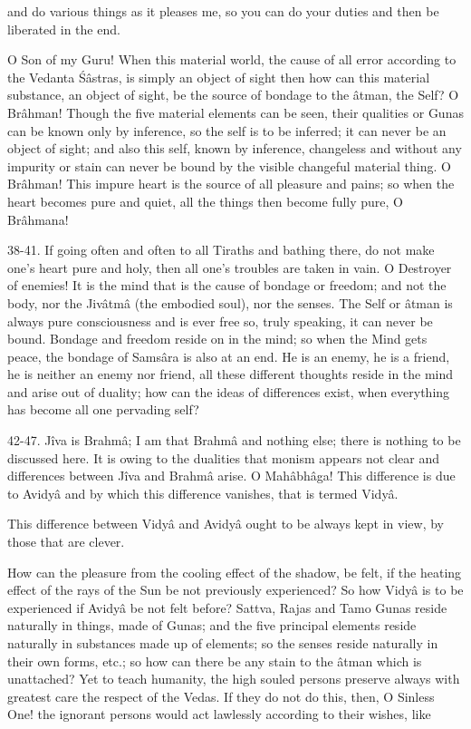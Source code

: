 and do various things as it pleases me, so you can do your duties and then be liberated in the end.

O Son of my Guru! When this material world, the cause of all error according to the Vedanta \'S\^astras, is simply an object of sight then how can this material substance, an object of sight, be the source of bondage to the \^atman, the Self? O Br\^ahman! Though the five material elements can be seen, their qualities or Gunas can be known only by inference, so the self is to be inferred; it can never be an object of sight; and also this self, known by inference, changeless and without any impurity or stain can never be bound by the visible changeful material thing. O Br\^ahman! This impure heart is the source of all pleasure and pains; so when the heart becomes pure and quiet, all the things then become fully pure, O Br\^ahmana!

38-41. If going often and often to all Tiraths and bathing there, do not make one's heart pure and holy, then all one's troubles are taken in vain. O Destroyer of enemies! It is the mind that is the cause of bondage or freedom; and not the body, nor the Jiv\^atm\^a (the embodied soul), nor the senses. The Self or \^atman is always pure consciousness and is ever free so, truly speaking, it can never be bound. Bondage and freedom reside on in the mind; so when the Mind gets peace, the bondage of Sams\^ara is also at an end. He is an enemy, he is a friend, he is neither an enemy nor friend, all these different thoughts reside in the mind and arise out of duality; how can the ideas of differences exist, when everything has become all one pervading self?

42-47. J\^iva is Brahm\^a; I am that Brahm\^a and nothing else; there is nothing to be discussed here. It is owing to the dualities that monism appears not clear and differences between J\^iva and Brahm\^a arise. O Mah\^abh\^aga! This difference is due to Avidy\^a and by which this difference vanishes, that is termed Vidy\^a.

This difference between Vidy\^a and Avidy\^a ought to be always kept in view, by those that are clever.

How can the pleasure from the cooling effect of the shadow, be felt, if the heating effect of the rays of the Sun be not previously experienced? So how Vidy\^a is to be experienced if Avidy\^a be not felt before? Sattva, Rajas and Tamo Gunas reside naturally in things, made of Gunas; and the five principal elements reside naturally in substances made up of elements; so the senses reside naturally in their own forms, etc.; so how can there be any stain to the \^atman which is unattached? Yet to teach humanity, the high souled persons preserve always with greatest care the respect of the Vedas. If they do not do this, then, O Sinless One! the ignorant persons would act lawlessly according to their wishes, like

